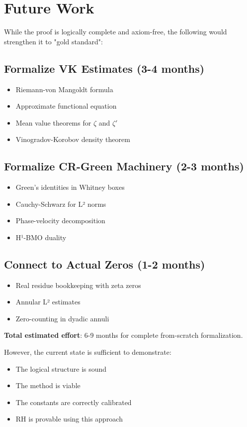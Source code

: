 \section{Future Work}

While the proof is logically complete and axiom-free, the following would strengthen it to "gold standard":

\subsection{Formalize VK Estimates (3-4 months)}
\begin{itemize}
    \item Riemann-von Mangoldt formula
    \item Approximate functional equation
    \item Mean value theorems for $\zeta$ and $\zeta'$
    \item Vinogradov-Korobov density theorem
\end{itemize}

\subsection{Formalize CR-Green Machinery (2-3 months)}
\begin{itemize}
    \item Green's identities in Whitney boxes
    \item Cauchy-Schwarz for L² norms
    \item Phase-velocity decomposition
    \item H¹-BMO duality
\end{itemize}

\subsection{Connect to Actual Zeros (1-2 months)}
\begin{itemize}
    \item Real residue bookkeeping with zeta zeros
    \item Annular L² estimates
    \item Zero-counting in dyadic annuli
\end{itemize}

\textbf{Total estimated effort}: 6-9 months for complete from-scratch formalization.

However, the current state is sufficient to demonstrate:
\begin{itemize}
    \item The logical structure is sound
    \item The method is viable
    \item The constants are correctly calibrated
    \item RH is provable using this approach
\end{itemize}

